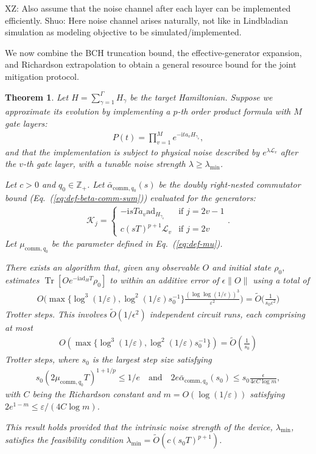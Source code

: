 \documentclass[aps,pra,reprint,groupedaddress,floatfix]{revtex4-2}
\newtheorem{theorem}{Theorem}
\newcommand{\eq}[1]{(\ref{eq:#1})}
\renewcommand{\i}{\mathrm{i}}
\renewcommand{\L}{\mathcal{L}}
\newcommand{\ad}{\mathrm{ad}}
\newcommand{\eps}{\varepsilon}
\newcommand{\mb}{\mathbb}
\newcommand{\xz}[1]{{\color{cyan} XZ: #1}}
\newcommand{\sz}[1]{{\color{blue} Shuo: #1}}
\begin{document}
\xz{Also assume that the noise channel after each layer can be implemented efficiently. }
\sz{Here noise channel arises naturally, not like in Lindbladian simulation as modeling objective to be simulated/implemented.}

We now combine the BCH truncation bound, the effective-generator expansion, and Richardson extrapolation to obtain a general resource bound for the joint mitigation protocol.
\begin{theorem}
\label{thm:general-application}
    Let $H = \sum_{\gamma = 1}^{\Gamma} H_{\gamma}$ be the target Hamiltonian. Suppose we approximate its evolution by implementing a $p$-th order product formula with $M$ gate layers:
    \begin{align*}
        P(t) = \prod_{v=1}^M e^{-\i t a_v H_{\gamma_v}},
    \end{align*}
    and that the implementation is subject to physical noise described by $e^{\lambda \L_v}$ after the $v$-th gate layer, with a tunable noise strength $\lambda \ge \lambda_{\min}$.
    
    Let $c>0$ and $q_0\in \mb Z_+$. Let $\bar{\alpha}_{\mathrm{comm},q_0}(s)$ be the doubly right-nested commutator bound (Eq.~\eq{def-beta-comm-sum}) evaluated for the generators:
    \begin{align*}
        \mathcal{K}_j= \begin{cases}-\i sT a_{v}\ad_{H_{\gamma_v}} & \text{if } j = 2v-1\\ c(sT)^{p+1}\mathcal{L}_v & \text{if } j = 2v \end{cases}.
    \end{align*}
    Let $\mu_{\mathrm{comm},q_0}$ be the parameter defined in Eq.~\eq{def-mu}. 
    
    There exists an algorithm that, given any observable $O$ and initial state $\rho_0$, estimates $\operatorname{Tr}[O e^{-\i \ad_H T}\rho_0]$ to within an additive error of $\epsilon\|O\|$ using a total of \begin{align*}
        O\Big( \max\{\log^3(1/\eps), \log^2(1/\eps)s_0^{-1}\}\frac{(\log\log (1/\eps))^3}{\eps^2}\Big)  = \widetilde{O}\Big(\frac{1}{s_0 \eps^2}\Big)
    \end{align*}Trotter steps. This involves $\widetilde{O}(1/\epsilon^2)$ independent circuit runs, each comprising at most 
    \begin{align*}
        O( \max\{\log^3(1/\eps), \log^2(1/\eps)s_0^{-1}\}) = \widetilde{O}\left( \frac{1}{s_0} \right)
    \end{align*} Trotter steps,
    where $s_0$ is the largest step size satisfying
    \begin{align} \label{eq:s0-general}
       s_0 (2\mu_{\mathrm{comm},q_0}T)^{1+1/p} \le 1/e \quad \text{and} \quad
       2e \bar{\alpha}_{\mathrm{comm},q_0}(s_0) \le s_0 \frac{\epsilon}{4eC\log m},
    \end{align}
    with $C$ being the Richardson constant and $m = O(\log(1/\eps))$ satisfying $2e^{1-m} \le \eps /(4C\log m)$.
    
    This result holds provided that the intrinsic noise strength of the device, $\lambda_{\min}$, satisfies the feasibility condition $\lambda_{\min} = \widetilde{O}(c (s_0 T)^{p+1})$.
\end{theorem}
\end{document}
